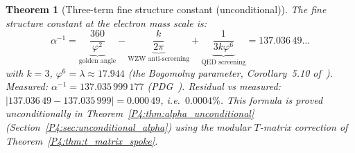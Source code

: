 \documentclass[11pt,a4paper]{article}
\newtheorem{theorem}{Theorem}[section]
\theoremstyle{definition}
\theoremstyle{remark}
\newcommand{\vp}{\varphi}
\newcommand{\aInv}{\alpha^{-1}}
\begin{document}
\begin{theorem}[Three-term fine structure constant (unconditional)]
\label{P4:thm:three_term_alpha}
The fine structure constant at the electron mass scale is:
\begin{equation}
  \boxed{
  \aInv
  = \underbrace{\frac{360}{\vp^2}}_{\text{golden angle}}
  - \underbrace{\frac{k}{2\pi}}_{\text{WZW anti-screening}}
  + \underbrace{\frac{1}{3k\vp^6}}_{\text{QED screening}}
  = 137.036\,49\ldots
  }
  \label{P4:eq:three_term}
\end{equation}
with $k=3$, $\vp^6 = \lambda \approx 17.944$ (the Bogomolny parameter,
Corollary~5.10 of~\cite{Paper1}).  Measured: $\aInv = 137.035\,999\,177$
(PDG~\cite{PDG2024}).  Residual vs measured: $|137.036\,49 - 137.035\,999| = 0.000\,49$,
i.e.\ $0.0004\%$.  This formula is proved unconditionally in
Theorem~\ref{P4:thm:alpha_unconditional} (Section~\ref{P4:sec:unconditional_alpha})
using the modular $T$-matrix correction of Theorem~\ref{P4:thm:t_matrix_spoke}.
\end{theorem}
\end{document}
